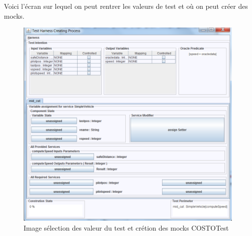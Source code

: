     \vspace*{\fill}
    \clearpage
    \vspace*{\fill}
 
 Voici l'écran sur lequel on peut rentrer les valeurs de test et où on peut créer des mocks. 
\begin{figure}[H]
    \begin{center}
        \includegraphics[scale=0.6]{images/CreationMockCOSTOTest.png}
        \caption{Image sélection des valeur du test et crétion des mocks COSTOTest}
        \label{fig:CreationMockCOSTOTest}
    \end{center}
\end{figure}

    \vspace*{\fill}
    \clearpage
    \vspace*{\fill}

